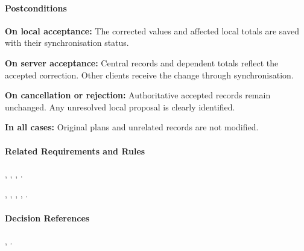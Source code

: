 \paragraph{Postconditions}

\textbf{On local acceptance:}
The corrected values and affected local totals
are saved with their synchronisation status.

\textbf{On server acceptance:}
Central records and dependent totals
reflect the accepted correction.
Other clients receive the change
through synchronisation.

\textbf{On cancellation or rejection:}
Authoritative accepted records remain unchanged.
Any unresolved local proposal is clearly identified.

\textbf{In all cases:}
Original plans and unrelated records
are not modified.

\paragraph{Related Requirements and Rules}
\hyperref[fr:033]{}, \hyperref[fr:036]{}, \hyperref[fr:037]{}, \hyperref[fr:061]{}.

\hyperref[br:011]{}, \hyperref[br:018]{}, \hyperref[br:019]{}, \hyperref[br:020]{}, \hyperref[br:021]{}.

\paragraph{Decision References}
, .
